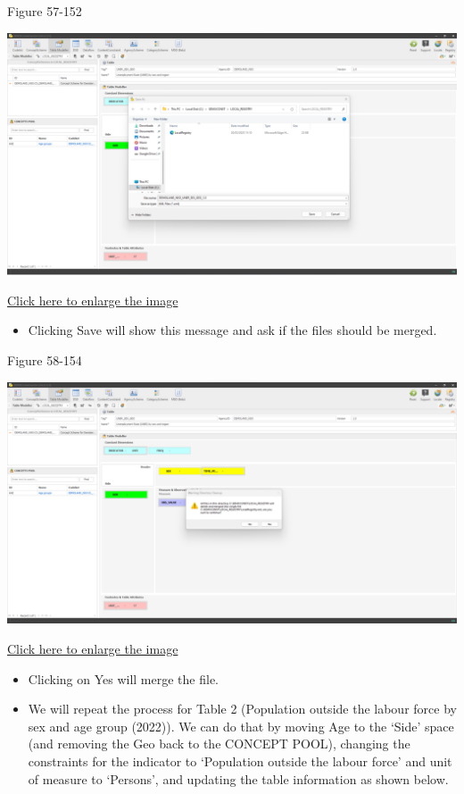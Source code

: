 \documentclass[
]{book}
\providecommand{\tightlist}{%
  \setlength{\itemsep}{0pt}\setlength{\parskip}{0pt}}
\theoremstyle{definition}
\theoremstyle{definition}
\theoremstyle{definition}
\theoremstyle{definition}
\theoremstyle{remark}
\begin{document}
Figure 57-152

\begin{center}\includegraphics[width=1\linewidth]{./images/image152} \end{center}

\href{images/image152.png}{Click here to enlarge the image}

\begin{itemize}
\tightlist
\item
  Clicking Save will show this message and ask if the files should be merged.
\end{itemize}

Figure 58-154

\begin{center}\includegraphics[width=1\linewidth]{./images/image154} \end{center}

\href{images/image154.png}{Click here to enlarge the image}

\begin{itemize}
\tightlist
\item
  Clicking on Yes will merge the file.
\item
  We will repeat the process for Table 2 (Population outside the labour force by sex and age group (2022)). We can do that by moving Age to the `Side' space (and removing the Geo back to the CONCEPT POOL), changing the constraints for the indicator to `Population outside the labour force' and unit of measure to `Persons', and updating the table information as shown below.
\end{itemize}
\end{document}

